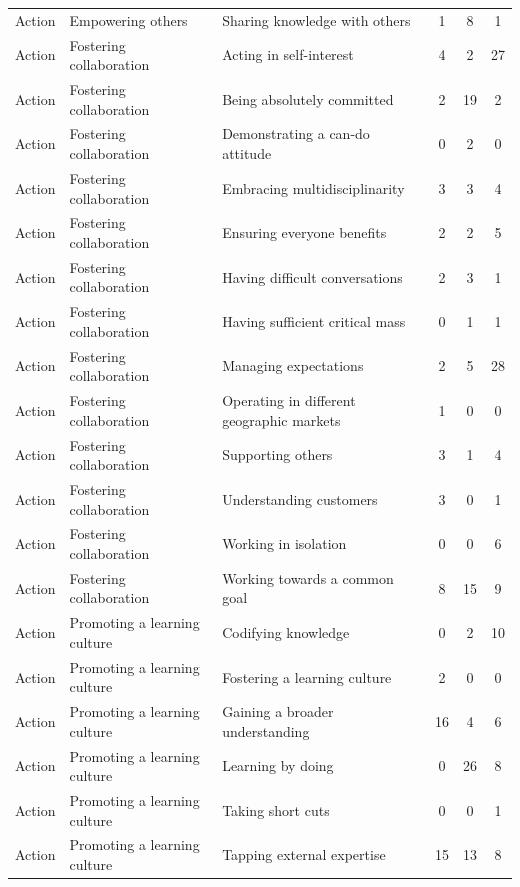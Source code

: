 \begin{landscape}
\begin{longtable}[c]{lllccc}
Action & Empowering others & Sharing knowledge with others &   1 &   8 &   1 \\ 
Action & Fostering collaboration & Acting in self-interest &   4 &   2 &  27 \\ 
Action & Fostering collaboration & Being absolutely committed &   2 &  19 &   2 \\ 
Action & Fostering collaboration & Demonstrating a can-do attitude &   0 &   2 &   0 \\ 
Action & Fostering collaboration & Embracing multidisciplinarity &   3 &   3 &   4 \\ 
Action & Fostering collaboration & Ensuring everyone benefits &   2 &   2 &   5 \\ 
Action & Fostering collaboration & Having difficult conversations &   2 &   3 &   1 \\ 
Action & Fostering collaboration & Having sufficient critical mass &   0 &   1 &   1 \\ 
Action & Fostering collaboration & Managing expectations &   2 &   5 &  28 \\ 
Action & Fostering collaboration & Operating in different geographic markets &   1 &   0 &   0 \\ 
Action & Fostering collaboration & Supporting others &   3 &   1 &   4 \\ 
Action & Fostering collaboration & Understanding customers &   3 &   0 &   1 \\ 
Action & Fostering collaboration & Working in isolation &   0 &   0 &   6 \\ 
Action & Fostering collaboration & Working towards a common goal &   8 &  15 &   9 \\ 
Action & Promoting a learning culture & Codifying knowledge &   0 &   2 &  10 \\ 
Action & Promoting a learning culture & Fostering a learning culture &   2 &   0 &   0 \\ 
Action & Promoting a learning culture & Gaining a broader understanding &  16 &   4 &   6 \\ 
Action & Promoting a learning culture & Learning by doing &   0 &  26 &   8 \\ 
Action & Promoting a learning culture & Taking short cuts &   0 &   0 &   1 \\ 
Action & Promoting a learning culture & Tapping external expertise &  15 &  13 &   8 \\ 
\end{longtable}
\end{landscape}
